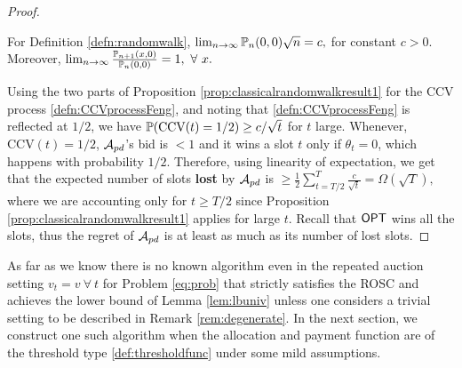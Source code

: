 \begin{proof}
\begin{prop}\label{prop:classicalrandomwalkresult1}\cite{port1965} 
For Definition \ref{defn:randomwalk},  
$\lim_{n\rightarrow \infty} {\mathbb{P}}_n(0,0)\sqrt{n} = c,$ for constant $c>0$. Moreover, $\lim_{n\rightarrow \infty} \frac{{\mathbb{P}}_{n+1}(x,0)}{{\mathbb{P}}_n(0,0)} =1, \ \forall \ x. $
\end{prop}


Using the two parts of Proposition \ref{prop:classicalrandomwalkresult1} for the CCV process \eqref{defn:CCVprocessFeng}, and noting that \eqref{defn:CCVprocessFeng} is reflected at $1/2$, we have 
${\mathbb{P}}(\text{CCV}(t) = 1/2)\ge c/ \sqrt{t}$ for $t$ large.
Whenever, $\text{CCV}(t) =1/2$,  $\mathcal{A}_{pd}$'s bid is $<1$ and it wins a slot $t$ only if $\theta_t=0$, which happens with probability $1/2$.
Therefore, using linearity of expectation, we get that the expected number of  slots {\bf lost} by $\mathcal{A}_{pd}$ is 
$\ge \frac{1}{2} \sum_{t=T/2}^T \frac{c}{\sqrt{t}} = \Omega(\sqrt{T}),$
where we are accounting only for $t\ge T/2$ since Proposition \ref{prop:classicalrandomwalkresult1} applies for large $t$. 
Recall that $\mathsf{OPT}$ wins all the slots, thus the regret of $\mathcal{A}_{pd}$ is at least as much as its number of lost slots.
\end{proof}

As far as we know there is no known algorithm even in the repeated auction setting $v_t=v \ \forall \ t $  for Problem \ref{eq:prob} that strictly satisfies the ROSC and achieves the lower bound of Lemma \ref{lem:lbuniv} unless one considers a trivial setting \cite{Feng} to be described in Remark \ref{rem:degenerate}. 
In the next section, we construct one such algorithm when the allocation and payment function are of the threshold type \eqref{def:thresholdfunc} under some mild assumptions.  %
%
